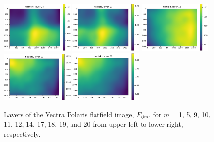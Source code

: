 \documentclass[letterpaper,11pt]{article}
\begin{document}
\begin{figure}[!ht]
\includegraphics[width=0.32\textwidth]{images/results/flatfield_layers_polaris/flatfield_layer_14}
\includegraphics[width=0.32\textwidth]{images/results/flatfield_layers_polaris/flatfield_layer_17}
\includegraphics[width=0.32\textwidth]{images/results/flatfield_layers_polaris/flatfield_layer_18}
\includegraphics[width=0.32\textwidth]{images/results/flatfield_layers_polaris/flatfield_layer_19}
\includegraphics[width=0.32\textwidth]{images/results/flatfield_layers_polaris/flatfield_layer_20}
\caption{\footnotesize Layers of the Vectra Polaris flatfield image, $F_{ijm}$, for $m=$1, 5, 9, 10, 11, 12, 14, 17, 18, 19, and 20 from upper left to lower right, respectively.}
\label{fig:flatfield_image_layers_polaris_1}
\end{figure}
\end{document}
